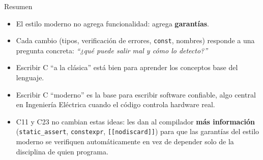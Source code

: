 \documentclass[aspectratio=169]{beamer}
\begin{document}
\begin{frame}{Resumen}
    \begin{itemize}
        \item El estilo moderno no agrega funcionalidad: agrega \textbf{garantías}.
        \item Cada cambio (tipos, verificación de errores, \texttt{const}, nombres)
              responde a una pregunta concreta: \textit{``¿qué puede salir mal y cómo lo detecto?''}
        \item Escribir C ``a la clásica'' está bien para aprender los conceptos
              base del lenguaje.
        \item Escribir C ``moderno'' es la base para escribir software confiable,
              algo central en Ingeniería Eléctrica cuando el código controla
              hardware real.
        \item C11 y C23 no cambian estas ideas: les dan al compilador
              \textbf{más información} (\texttt{static\_assert},
              \texttt{constexpr}, \texttt{[[nodiscard]]}) para que las
              garantías del estilo moderno se verifiquen automáticamente en
              vez de depender solo de la disciplina de quien programa.
    \end{itemize}
\end{frame}
\end{document}
